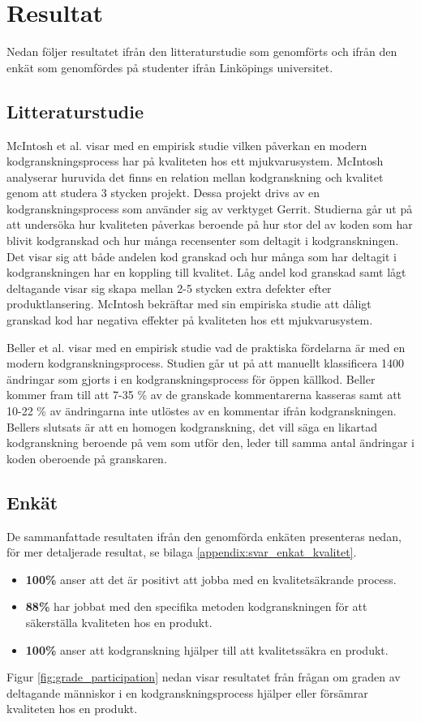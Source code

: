 \section{Resultat}
\label{sec:results-wallstrom}
Nedan följer resultatet ifrån den litteraturstudie som genomförts och ifrån den enkät som genomfördes på studenter ifrån Linköpings universitet. 

\subsection{Litteraturstudie}
McIntosh et al. \cite{mcintosh2014impact} visar med en empirisk studie vilken påverkan en modern kodgranskningsprocess har på kvaliteten hos ett mjukvarusystem. McIntosh analyserar huruvida det finns en relation mellan kodgranskning och kvalitet genom att studera 3 stycken projekt. Dessa projekt drivs av en kodgranskningsprocess som använder sig av verktyget Gerrit. Studierna går ut på att undersöka hur kvaliteten påverkas beroende på hur stor del av koden som har blivit kodgranskad och hur många recensenter som deltagit i kodgranskningen. Det visar sig att både andelen kod granskad och hur många som har deltagit i kodgranskningen har en koppling till kvalitet. Låg andel kod granskad samt lågt deltagande visar sig skapa mellan 2-5 stycken extra defekter efter produktlansering. McIntosh bekräftar med sin empiriska studie att dåligt granskad kod har negativa effekter på kvaliteten hos ett mjukvarusystem.

Beller et al. \cite{beller2014modern} visar med en empirisk studie vad de praktiska fördelarna är med en modern kodgranskningsprocess. Studien går ut på att manuellt klassificera 1400 ändringar som gjorts i en kodgranskningsprocess för öppen källkod. Beller kommer fram till att 7-35 \% av de granskade kommentarerna kasseras samt att 10-22 \% av ändringarna inte utlöstes av en kommentar ifrån kodgranskningen. Bellers slutsats är att en homogen kodgranskning, det vill säga en likartad kodgranskning beroende på vem som utför den, leder till samma antal ändringar i koden oberoende på granskaren.

\subsection{Enkät}
De sammanfattade resultaten ifrån den genomförda enkäten presenteras nedan, för mer detaljerade resultat, se bilaga \ref{appendix:svar_enkat_kvalitet}.
\begin{itemize}
	\item \textbf{100\%} anser att det är positivt att jobba med en kvalitetsäkrande process.
	\item \textbf{88\%} har jobbat med den specifika metoden kodgranskningen för att säkerställa kvaliteten hos en produkt.
	\item \textbf{100\%} anser att kodgranskning hjälper till att kvalitetssäkra en produkt.
\end{itemize}
Figur \ref{fig:grade_participation} nedan visar resultatet från frågan om graden av deltagande människor i en kodgranskningsprocess hjälper eller försämrar kvaliteten hos en produkt.

